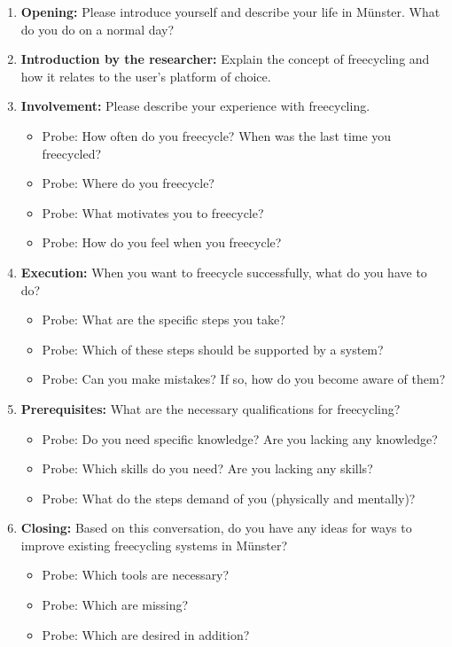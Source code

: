 \begin{enumerate}
    \item \textbf{Opening:} Please introduce yourself and describe your life in Münster. What do you do on a normal day?\par\par
    
    \item \textbf{Introduction by the researcher:} Explain the concept of freecycling and how it relates to the user’s platform of choice.

    \item \textbf{Involvement:} Please describe your experience with freecycling.

    \begin{itemize}
        \item Probe: How often do you freecycle? When was the last time you freecycled?
        \item Probe: Where do you freecycle?
        \item Probe: What motivates you to freecycle?
        \item Probe: How do you feel when you freecycle?
    \end{itemize}

    \item \textbf{Execution:} When you want to freecycle successfully, what do you have to do?

    \begin{itemize}
        \item Probe: What are the specific steps you take?
        \item Probe: Which of these steps should be supported by a system?
        \item Probe: Can you make mistakes? If so, how do you become aware of them?
    \end{itemize}

    \item \textbf{Prerequisites:} What are the necessary qualifications for freecycling?

    \begin{itemize}
        \item Probe: Do you need specific knowledge? Are you lacking any knowledge?
        \item Probe: Which skills do you need? Are you lacking any skills?
        \item Probe: What do the steps demand of you (physically and mentally)?
    \end{itemize}

    \item \textbf{Closing:} Based on this conversation, do you have any ideas for ways to improve existing freecycling systems in Münster?

    \begin{itemize}
        \item Probe: Which tools are necessary?
        \item Probe: Which are missing?
        \item Probe: Which are desired in addition?
    \end{itemize}
\end{enumerate}


